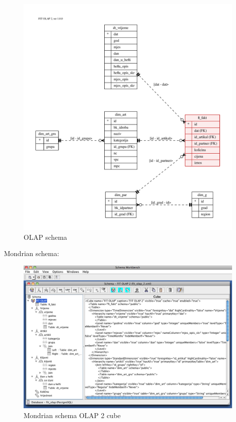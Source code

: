 \documentclass[times, utf8, seminar]{fit}
\begin{document}
\begin{figure}[h]
\centering
\includegraphics[width=15cm]{img/F18_olap.pdf}
\caption{OLAP schema}
\end{figure}


Mondrian schema:

\begin{figure}[h]
\centering
\includegraphics[width=15cm]{img/fit_olap_mondrian_schema}
\caption{Mondrian schema OLAP 2 cube}
\end{figure}
\end{document}
